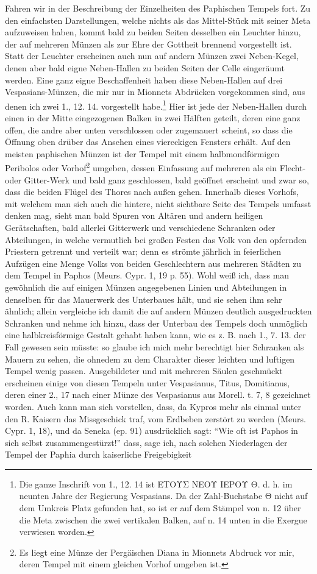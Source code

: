 \documentclass[a4paper, 11pt, oneside, polutonikogreek, german]{article}
\begin{document}
Fahren wir in der Beschreibung der Einzelheiten des Paphischen Tempels fort. Zu den einfachsten Darstellungen, welche nichts als das Mittel-Stück mit seiner Meta aufzuweisen haben, kommt bald zu beiden Seiten desselben ein Leuchter hinzu, der auf mehreren Münzen als zur Ehre der Gottheit brennend vorgestellt ist. Statt der Leuchter erscheinen auch nun auf andern Münzen zwei Neben-Kegel, denen aber bald eigne Neben-Hallen zu beiden Seiten der Celle eingeräumt werden. Eine ganz eigne Beschaffenheit haben diese Neben-Hallen auf drei Vespasians-Münzen, die mir nur in Mionnets Abdrücken vorgekommen sind, aus denen ich zwei 1., 12. 14. vorgestellt habe.\footnote{Die ganze Inschrift von 1., 12. 14 ist ΕΤΟΥΣ ΝΕΟΥ ΙΕΡΟΥ Θ. d. h. im neunten Jahre der Regierung Vespasians. Da der Zahl-Buchstabe Θ nicht auf dem Umkreis Platz gefunden hat, so ist er auf dem Stämpel von n. 12 über die Meta zwischen die zwei vertikalen Balken, auf n. 14 unten in die Exergue verwiesen worden.} Hier ist jede der Neben-Hallen durch einen in der Mitte eingezogenen Balken in zwei Hälften geteilt, deren eine ganz offen, die andre aber unten verschlossen oder zugemauert scheint, so dass die Öffnung oben drüber das Ansehen eines viereckigen Fensters erhält. Auf den meisten paphischen Münzen ist der Tempel mit einem halbmondförmigen Peribolos oder Vorhof\footnote{Es liegt eine Münze der Pergäischen Diana in Mionnets Abdruck vor mir, deren Tempel mit einem gleichen Vorhof umgeben ist.} umgeben, dessen Einfassung auf mehreren als ein Flecht- oder Gitter-Werk und bald ganz geschlossen, bald geöffnet erscheint und zwar so, dass die beiden Flügel des Thores nach außen gehen. Innerhalb dieses Vorhofs, mit welchem man sich auch die hintere, nicht sichtbare Seite des Tempels umfasst denken mag, sieht man bald Spuren von Altären und andern heiligen Gerätschaften, bald allerlei Gitterwerk und verschiedene Schranken oder Abteilungen, in welche vermutlich bei großen Festen das Volk von den opfernden Priestern getrennt und verteilt war; denn es strömte jährlich in feierlichen Aufzügen eine Menge Volks von beiden Geschlechtern aus mehreren Städten zu dem Tempel in Paphos (Meurs. Cypr. 1, 19 p. 55). Wohl weiß ich, dass man gewöhnlich die auf einigen Münzen angegebenen Linien und Abteilungen in denselben für das Mauerwerk des Unterbaues hält, und sie sehen ihm sehr ähnlich; allein vergleiche ich damit die auf andern Münzen deutlich ausgedruckten Schranken und nehme ich hinzu, dass der Unterbau des Tempels doch unmöglich eine halbkreisförmige Gestalt gehabt haben kann, wie es z. B. nach 1., 7. 13. der Fall gewesen sein müsste: so glaube ich mich mehr berechtigt hier Schranken als Mauern zu sehen, die ohnedem zu dem Charakter dieser leichten und luftigen Tempel wenig passen. Ausgebildeter und mit mehreren Säulen geschmückt erscheinen einige von diesen Tempeln unter Vespasianus, Titus, Domitianus, deren einer 2., 17 nach einer Münze des Vespasianus aus Morell. t. 7, 8 gezeichnet worden. Auch kann man sich vorstellen, dass, da Kypros mehr als einmal unter den R. Kaisern das Missgeschick traf, vom Erdbeben zerstört zu werden (Meurs. Cypr. 1, 18), und da Seneka (ep. 91) ausdrücklich sagt: "`Wie oft ist Paphos in sich selbst zusammengestürzt!"' dass, sage ich, nach solchen Niederlagen der Tempel der Paphia durch kaiserliche Freigebigkeit 
\end{document}
